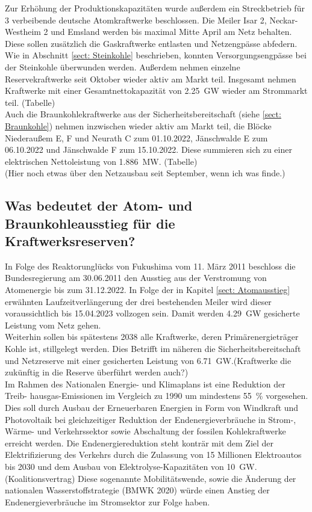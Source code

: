 		Zur Erhöhung der Produktionskapazitäten wurde außerdem ein Streckbetrieb für 3 verbeibende deutsche Atomkraftwerke beschlossen. Die Meiler Isar 2, Neckar-Westheim 2 und Emsland werden bis maximal Mitte April am Netz behalten. Diese sollen zusätzlich die Gaskraftwerke entlasten und Netzengpässe abfedern.\\
		Wie in Abschnitt \ref{sect: Steinkohle} beschrieben, konnten Versorgungsengpässe bei der Steinkohle überwunden werden. Außerdem nehmen einzelne Reservekraftwerke seit Oktober wieder aktiv am Markt teil. Insgesamt nehmen Kraftwerke mit einer Gesamtnettokapazität von \SI{2,25}{\giga \watt} wieder am Strommarkt teil. (Tabelle)\\
		Auch die Braunkohlekraftwerke aus der Sicherheitsbereitschaft (siehe \ref{sect: Braunkohle}) nehmen inzwischen wieder aktiv am Markt teil, die Blöcke Niederaußem E, F und Neurath C zum 01.10.2022, Jänschwalde E zum 06.10.2022 und Jänschwalde F zum 15.10.2022. Diese summieren sich zu einer elektrischen Nettoleistung von \SI{1,886}{\mega \watt}. (Tabelle)\\
		
		(Hier noch etwas über den Netzausbau seit September, wenn ich was finde.)
		
		
		
	
	\subsection{Was bedeutet der Atom- und Braunkohleausstieg für die Kraftwerksreserven?}
	In Folge des Reaktorunglücks von Fukushima vom 11. März 2011 beschloss die Bundesregierung am 30.06.2011 den Ausstieg aus der Verstromung von Atomenergie bis zum 31.12.2022. In Folge der in Kapitel \ref{sect: Atomausstieg} erwähnten Laufzeitverlängerung der drei bestehenden Meiler wird dieser voraussichtlich bis 15.04.2023 vollzogen sein. Damit werden \SI{4,29}{\giga \watt} gesicherte Leistung vom Netz gehen.\\
	Weiterhin sollen bis spätestens 2038 alle Kraftwerke, deren Primärenergieträger Kohle ist, stillgelegt werden. Dies Betrifft im näheren die Sicherheitsbereitschaft und Netzreserve mit einer gesicherten Leistung von \SI{6,71}{\giga \watt}.(Kraftwerke die zukünftig in die Reserve überführt werden auch?)\\
	Im Rahmen des Nationalen Energie- und Klimaplans ist eine Reduktion der Treib-
	hausgas-Emissionen im Vergleich zu 1990 um mindestens \SI{55}{\percent} vorgesehen. Dies soll durch Ausbau der Erneuerbaren Energien in Form von Windkraft und Photovoltaik bei gleichzeitiger Reduktion der Endenergieverbräuche in Strom-, Wärme- und Verkehrssektor sowie Abschaltung der fossilen Kohlekraftwerke erreicht werden. Die Endenergiereduktion steht konträr mit dem Ziel der Elektrifizierung des Verkehrs durch die Zulassung von 15 Millionen Elektroautos bis 2030 und dem Ausbau von Elektrolyse-Kapazitäten von \SI{10}{\giga \watt}. (Koalitionsvertrag) Diese sogenannte Mobilitätswende, sowie die Änderung der nationalen Wasserstoffstrategie (BMWK 2020) würde einen Anstieg der Endenergieverbräuche im Stromsektor zur Folge haben.\\
	
